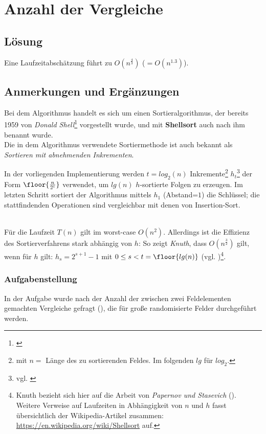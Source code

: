 \chapter{Anzahl der Vergleiche}

\section*{Lösung}

Eine Laufzeitabschätzung führt zu $O(n^{\frac{4}{3}})$ ($ = O(n^{1.3})$).


\section*{Anmerkungen und Ergänzungen}

Bei dem Algorithmus handelt es sich um einen Sortieralgorithmus, der bereits 1959 von \textit{Donald Shell}\footnote{
\cite[]{She59}
} vorgestellt wurde, und mit \textbf{Shellsort} auch nach ihm benannt wurde.\\

Die in dem Algorithmus verwendete Sortiermethode ist auch bekannt als \textit{Sortieren mit abnehmenden Inkrementen}\cite[88]{OW17b}.

In der vorliegenden Implementierung werden $t = log_2(n)$  Inkremente\footnote{
    mit $n =$ Länge des zu sortierenden Feldes. Im folgenden $lg$ für $log_2$.
} $h_t$\footnote{
vgl. \cite[84]{Knu97b}
} der Form $\floor{\frac{n}{2^i}}$ verwendet, um $lg(n)$ $h$-sortierte Folgen zu erzeugen.
Im letzten Schritt sortiert der Algorithmus mittels $h_1$ (Abstand=$1$) die Schlüssel; die stattfindenden Operationen sind vergleichbar mit denen von Insertion-Sort.

\\
Für die Laufzeit $T(n)$ gilt im worst-case $O(n^2)$.
Allerdings ist die Effizienz des Sortierverfahrens stark abhängig von $h$: So zeigt \textit{Knuth}, dass $O(n^{\frac{3}{2}})$ gilt, wenn für $h$ gilt: $h_s = 2^{s+1} - 1$ mit $0 \leq s < t = \floor{lg(n)}$ (vgl. \cite[91]{Knu97b})\footnote{
Knuth bezieht sich hier auf die Arbeit von \textit{Papernov und Stasevich} (\cite[]{PS65}).
Weitere Verweise auf Laufzeiten in Abhängigkeit von $n$ und $h$ fasst übersichtlich der Wikipedia-Artikel zusammen: \url{https://en.wikipedia.org/wiki/Shellsort} auf.
}.
\\
\subsection*{Aufgabenstellung}
In der Aufgabe wurde nach der Anzahl der zwischen zwei Feldelementen gemachten Vergleiche gefragt (), die für große randomisierte Felder durchgeführt werden.

